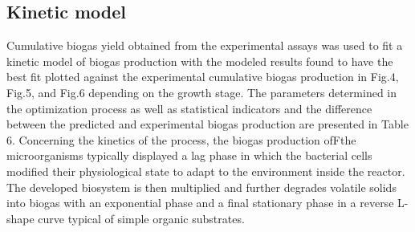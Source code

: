 \subsection{Kinetic model}
Cumulative biogas yield obtained from the experimental assays was used to fit a kinetic model of biogas production with the modeled results found to have the best fit plotted against the experimental cumulative biogas production in Fig.4, Fig.5, and Fig.6 depending on the growth stage. The parameters determined in the optimization process as well as statistical indicators and the difference between the predicted and experimental biogas production are presented in Table 6.
Concerning the kinetics of the process, the biogas production ofFthe microorganisms typically displayed a lag phase in which the bacterial cells modified their physiological state to adapt to the environment inside the reactor. The developed biosystem is then multiplied and further degrades volatile solids into biogas with an exponential phase and a final stationary phase in a reverse L-shape curve typical of simple organic substrates.    